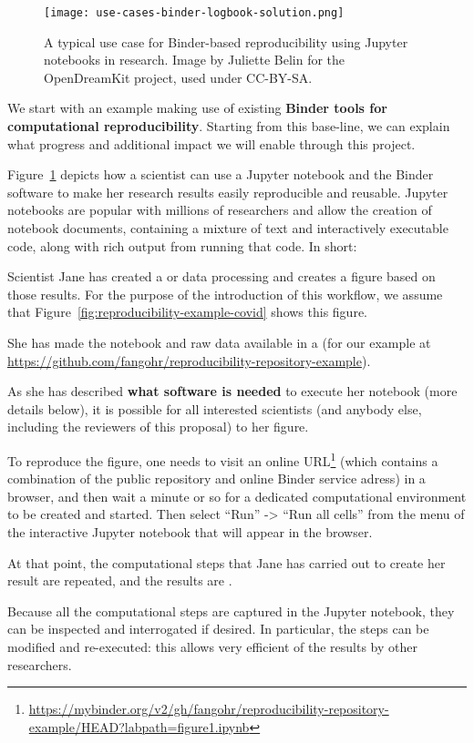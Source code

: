 \begin{figure}[htb]\centering
  \texttt{[image: use-cases-binder-logbook-solution.png]}
  \caption{A typical use case for Binder-based reproducibility using Jupyter notebooks in research.
            Image by Juliette Belin for the OpenDreamKit project, used under
            CC-BY-SA.}\label{fig:use-cases-binder}
\end{figure}

We start with an example making use of existing \textbf{Binder
tools for computational reproducibility}. Starting from this base-line, we can
explain what progress and additional impact we will enable through this project.

Figure~\ref{fig:use-cases-binder} depicts how a scientist can use a Jupyter
notebook and the Binder software to make her research results easily
reproducible and reusable. Jupyter notebooks are popular with millions of researchers and allow the creation of notebook
documents, containing a mixture of text and interactively executable code, along with rich output from
running that code. In short:
\begin{compactitem}
\item Scientist Jane has created a  or
  data processing and creates a figure based on those results. For the purpose
  of the introduction of this workflow, we assume that
  Figure~\ref{fig:reproducibility-example-covid} shows this figure.

\item She has made the notebook and raw data available in a 
  (for our example at\newline
  \mbox{\url{https://github.com/fangohr/reproducibility-repository-example}}).

\item As she has described \textbf{what software is needed} to execute her notebook (more
  details below), it is possible for all interested scientists (and anybody
  else, including the reviewers of this proposal) to  her
  figure.

  To reproduce the figure, one needs to visit an online 
  URL\footnote{\url{https://mybinder.org/v2/gh/fangohr/reproducibility-repository-example/HEAD?labpath=figure1.ipynb}}
  (which contains a combination of the public repository and online Binder service adress) 
  in a browser, and then wait a minute or so for a dedicated computational
  environment to be created and started. Then select ``Run'' -> ``Run all cells''
  from the menu of the interactive Jupyter notebook that will appear in the
  browser.

  At that point, the computational steps that Jane has carried out to create her
  result are repeated, and the results are .

\item Because all the computational steps are captured in the Jupyter notebook,
  they can be inspected and interrogated if desired. In particular, the steps
  can be modified and re-executed: this allows very efficient  of
  the results by other researchers.
\end{compactitem}


